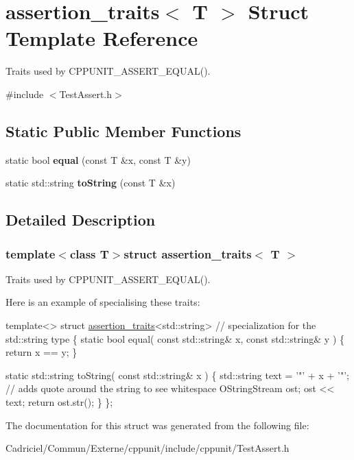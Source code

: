 \hypertarget{structassertion__traits}{\section{assertion\-\_\-traits$<$ T $>$ Struct Template Reference}
\label{structassertion__traits}
}


Traits used by C\-P\-P\-U\-N\-I\-T\-\_\-\-A\-S\-S\-E\-R\-T\-\_\-\-E\-Q\-U\-A\-L().  




{\ttfamily \#include $<$Test\-Assert.\-h$>$}

\subsection*{Static Public Member Functions}
\begin{DoxyCompactItemize}
\item 
\hypertarget{structassertion__traits_a287c07a4e171256a0128201c7e4c4228}{static bool {\bfseries equal} (const T \&x, const T \&y)}\label{structassertion__traits_a287c07a4e171256a0128201c7e4c4228}

\item 
\hypertarget{structassertion__traits_a1c96296fb44902b4f22d99b9c3cc7749}{static std\-::string {\bfseries to\-String} (const T \&x)}\label{structassertion__traits_a1c96296fb44902b4f22d99b9c3cc7749}

\end{DoxyCompactItemize}


\subsection{Detailed Description}
\subsubsection*{template$<$class T$>$struct assertion\-\_\-traits$<$ T $>$}

Traits used by C\-P\-P\-U\-N\-I\-T\-\_\-\-A\-S\-S\-E\-R\-T\-\_\-\-E\-Q\-U\-A\-L(). 

Here is an example of specialising these traits\-:


\begin{DoxyCode}
\textcolor{keyword}{template}<>
\textcolor{keyword}{struct }\hyperlink{structassertion__traits}{assertion\_traits}<std::string>   \textcolor{comment}{// specialization for the std::string type}
\{
  \textcolor{keyword}{static} \textcolor{keywordtype}{bool} equal( \textcolor{keyword}{const} std::string& x, \textcolor{keyword}{const} std::string& y )
  \{
    \textcolor{keywordflow}{return} x == y;
  \}

  \textcolor{keyword}{static} std::string toString( \textcolor{keyword}{const} std::string& x )
  \{
    std::string text = \textcolor{charliteral}{'"'} + x + \textcolor{charliteral}{'"'};    \textcolor{comment}{// adds quote around the string to see whitespace}
    OStringStream ost;
    ost << text;
    \textcolor{keywordflow}{return} ost.str();
  \}
\};
\end{DoxyCode}
 

The documentation for this struct was generated from the following file\-:\begin{DoxyCompactItemize}
\item 
Cadriciel/\-Commun/\-Externe/cppunit/include/cppunit/Test\-Assert.\-h\end{DoxyCompactItemize}
